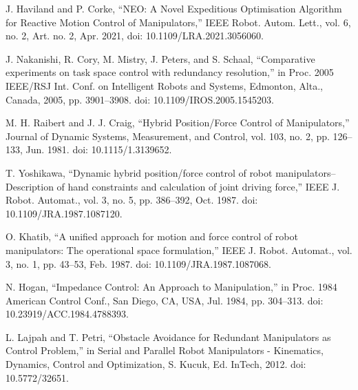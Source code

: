 \documentclass[letterpaper, 10 pt, conference]{ieeeconf}  %
\begin{document}
\begin{thebibliography}{99}
%
%	
%	





 J. Haviland and P. Corke, “NEO: A Novel Expeditious Optimisation Algorithm for Reactive Motion Control of Manipulators,” IEEE Robot. Autom. Lett., vol. 6, no. 2, Art. no. 2, Apr. 2021, doi: 10.1109/LRA.2021.3056060.




 J. Nakanishi, R. Cory, M. Mistry, J. Peters, and S. Schaal, “Comparative experiments on task space control with redundancy resolution,” in Proc. 2005 IEEE/RSJ Int. Conf. on Intelligent Robots and Systems, Edmonton, Alta., Canada, 2005, pp. 3901–3908. doi: 10.1109/IROS.2005.1545203.

 M. H. Raibert and J. J. Craig, “Hybrid Position/Force Control of Manipulators,” Journal of Dynamic Systems, Measurement, and Control, vol. 103, no. 2, pp. 126–133, Jun. 1981. doi: 10.1115/1.3139652.

 T. Yoshikawa, “Dynamic hybrid position/force control of robot manipulators--Description of hand constraints and calculation of joint driving force,” IEEE J. Robot. Automat., vol. 3, no. 5, pp. 386–392, Oct. 1987. doi: 10.1109/JRA.1987.1087120.

 O. Khatib, “A unified approach for motion and force control of robot manipulators: The operational space formulation,” IEEE J. Robot. Automat., vol. 3, no. 1, pp. 43–53, Feb. 1987. doi: 10.1109/JRA.1987.1087068.

 N. Hogan, “Impedance Control: An Approach to Manipulation,” in Proc. 1984 American Control Conf., San Diego, CA, USA, Jul. 1984, pp. 304–313. doi: 10.23919/ACC.1984.4788393.



 L. Lajpah and T. Petri, “Obstacle Avoidance for Redundant Manipulators as Control Problem,” in Serial and Parallel Robot Manipulators - Kinematics, Dynamics, Control and Optimization, S. Kucuk, Ed. InTech, 2012. doi: 10.5772/32651.


\end{thebibliography}
\end{document}
